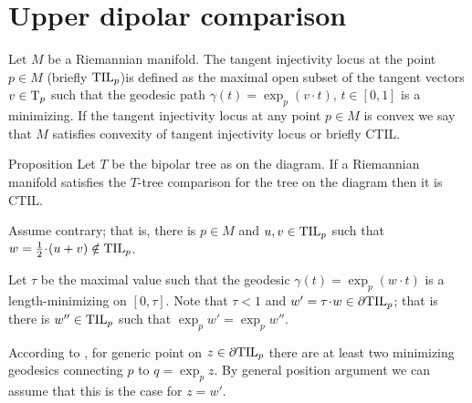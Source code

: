 \section{Upper dipolar comparison}

Let $M$ be a Riemannian manifold.
The tangent injectivity locus at the point $p\in M$ (briefly $\mathrm{\rm TIL}_p$)is defined as the maximal open subset of the tangent vectors $v\in\mathrm{T}_p$ such that the geodesic path $\gamma(t)=\exp_p(v\cdot t)$, $t\in [0,1]$ is a minimizing.
If the tangent injectivity locus at any point $p\in M$ is convex we say that $M$ satisfies convexity of  tangent injectivity locus or briefly CTIL.

{

\begin{wrapfigure}{r}{24 mm}
\end{wrapfigure}

\begin{thm}{Proposition}
Let $T$ be the bipolar tree as on the diagram.
If a Riemannian manifold satisfies the $T$-tree comparison for the tree on the diagram then it is CTIL.
\end{thm}

Assume contrary; that is, there is $p\in M$ and $u,v\in \mathrm{\rm TIL}_p$ such that $w=\tfrac12\cdot(u+v)\notin \TIL_p$.

}

Let $\tau$ be the maximal value such that the geodesic $\gamma(t)=\exp_p(w\cdot t)$ is a length-minimizing on $[0,\tau]$.
Note that $\tau<1$ and $w'=\tau\cdot w\in\partial \TIL_p$; that is there is $w''\in\mathrm{\rm TIL}_p$ such that $\exp_pw'=\exp_pw''$.



According to \cite{karcher}, for generic point on $z\in\partial \mathrm{\rm TIL}_p$ there are at least two minimizing geodesics connecting $p$ to $q=\exp_p z$.
By general position argument we can assume that this is the case for $z=w'$.

